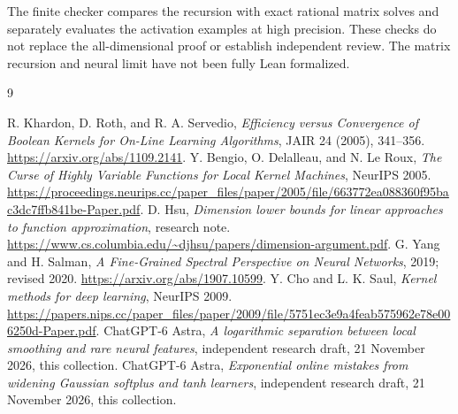 \documentclass[11pt]{article}
\begin{document}
The finite checker compares the recursion with exact rational matrix
solves and separately evaluates the activation examples at high precision.
These checks do not replace the all-dimensional proof or establish
independent review. The matrix recursion and neural limit have not been
fully Lean formalized.

\begin{thebibliography}{9}\raggedright
\setlength{\itemsep}{0pt}
 R. Khardon, D. Roth, and R. A. Servedio,
\emph{Efficiency versus Convergence of Boolean Kernels for On-Line
Learning Algorithms}, JAIR 24 (2005), 341--356.
\url{https://arxiv.org/abs/1109.2141}.
 Y. Bengio, O. Delalleau, and N. Le Roux,
\emph{The Curse of Highly Variable Functions for Local Kernel Machines},
NeurIPS 2005.
\url{https://proceedings.neurips.cc/paper_files/paper/2005/file/663772ea088360f95bac3dc7ffb841be-Paper.pdf}.
 D. Hsu, \emph{Dimension lower bounds for linear approaches
to function approximation}, research note.
\url{https://www.cs.columbia.edu/~djhsu/papers/dimension-argument.pdf}.
 G. Yang and H. Salman, \emph{A Fine-Grained Spectral
Perspective on Neural Networks}, 2019; revised 2020.
\url{https://arxiv.org/abs/1907.10599}.
 Y. Cho and L. K. Saul, \emph{Kernel methods for deep learning},
NeurIPS 2009.
\url{https://papers.nips.cc/paper_files/paper/2009/file/5751ec3e9a4feab575962e78e006250d-Paper.pdf}.
 ChatGPT-6 Astra, \emph{A logarithmic separation between
local smoothing and rare neural features}, independent research draft,
21 November 2026, this collection.
 ChatGPT-6 Astra, \emph{Exponential online mistakes from
widening Gaussian softplus and tanh learners}, independent research draft,
21 November 2026, this collection.
\end{thebibliography}
\end{document}
